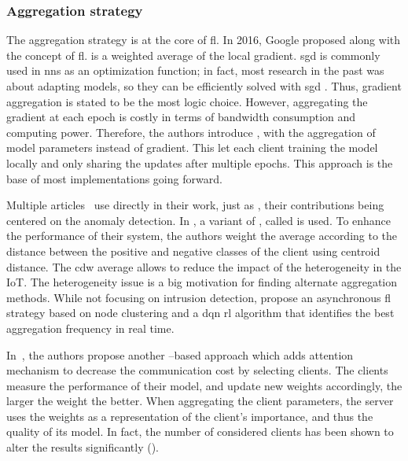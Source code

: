 

\subsubsection{Aggregation strategy}
\label{sec:sota.quali.agg}
The aggregation strategy is at the core of \gls{fl}.
In 2016, Google proposed  \cite{McMahan2017} along with the concept of \gls{fl}.
 is a weighted average of the local gradient.
\Gls{sgd} is commonly used in \glspl{nn} as an optimization function; in fact, most research in the past was about adapting models, so they can be efficiently solved with \gls{sgd} \cite{McMahan2017,Goodfellow2016}.
Thus, gradient aggregation is stated to be the most logic choice.
However, aggregating the gradient at each epoch is costly in terms of bandwidth consumption and computing power.
Therefore, the authors introduce , with the aggregation of model parameters instead of gradient.
This let each client training the model locally and only sharing the updates after multiple epochs.
This approach is the base of most implementations going forward.

Multiple articles~\cite{nguyen_DIoTFederatedSelflearning_2019,Popoola2021,qin_FederatedLearningBasedNetwork_2021,al-athbaal-marri_FederatedMimicLearning_2020,kim_CollaborativeAnomalyDetection_2020} use directly  in their work, just as \cite{rahman_InternetThingsIntrusion_2020}, their contributions being centered on the anomaly detection.
In \cite{zhang_BlockchainbasedFederatedLearning_2020}, a variant of , called  is used.
To enhance the performance of their system, the authors weight the average according to the distance between the positive and negative classes of the client using centroid distance.
The \gls{cdw} average allows to reduce the impact of the heterogeneity in the IoT.
The heterogeneity issue is a big motivation for finding alternate aggregation methods.
While not focusing on intrusion detection, \textcite{Sun2020a} propose an asynchronous \gls{fl} strategy based on node clustering and a \gls{dqn} \gls{rl} algorithm that identifies the best aggregation frequency in real time.

In~\cite{chen_Networkanomalydetection_2020b}, the authors propose another --based approach which adds attention mechanism to decrease the communication cost by selecting clients.
The clients measure the performance of their model, and update new weights accordingly, the larger the weight the better.
When aggregating the client parameters, the server uses the weights as a representation of the client's importance, and thus the quality of its model.
In fact, the number of considered clients has been shown to alter the results significantly ().

